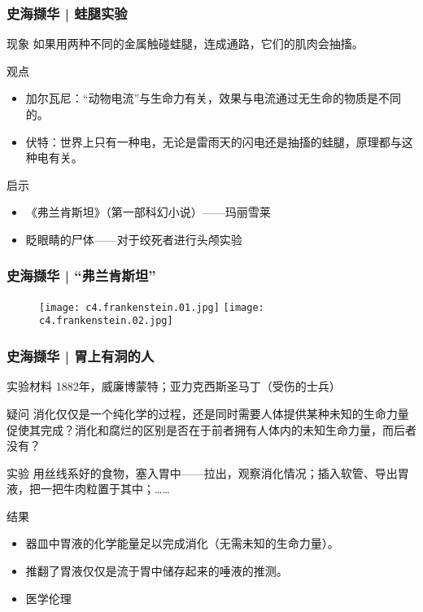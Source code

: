 \begin{frame}
  \frametitle{史海撷华 | 蛙腿实验}
  \begin{block}{现象}
    如果用两种不同的金属触碰蛙腿，连成通路，它们的肌肉会抽搐。
  \end{block}
  \pause
  \begin{block}{观点}
    \begin{itemize}
      \item 加尔瓦尼：“动物电流”与生命力有关，效果与电流通过无生命的物质是不同的。
      \item 伏特：世界上只有一种电，无论是雷雨天的闪电还是抽搐的蛙腿，原理都与这种电有关。
    \end{itemize}
  \end{block}
  \pause
  \begin{block}{启示}
    \begin{itemize}
      \item 《弗兰肯斯坦》（第一部科幻小说）——玛丽\textbullet 雪莱
      \item 眨眼睛的尸体——对于绞死者进行头颅实验
    \end{itemize}
  \end{block}
\end{frame}

\begin{frame}
  \frametitle{史海撷华 | “弗兰肯斯坦”}
  \begin{figure}
    \centering
    \texttt{[image: c4.frankenstein.01.jpg]}\quad
    \texttt{[image: c4.frankenstein.02.jpg]}
  \end{figure}
\end{frame}

\begin{frame}
  \frametitle{史海撷华 | 胃上有洞的人}
  \begin{block}{实验材料}
       1882年，威廉\textbullet 博蒙特；亚力克西斯\textbullet 圣马丁（受伤的士兵）
  \end{block}
  \vspace{-0.5em}
  \pause
  \begin{block}{疑问}
消化仅仅是一个纯化学的过程，还是同时需要人体提供某种未知的生命力量促使其完成？消化和腐烂的区别是否在于前者拥有人体内的未知生命力量，而后者没有？
  \end{block}
  \vspace{-0.5em}
  \pause
  \begin{block}{实验}
      用丝线系好的食物，塞入胃中——拉出，观察消化情况；插入软管、导出胃液，把一把牛肉粒置于其中；……
  \end{block}
  \vspace{-0.5em}
  \pause
  \begin{block}{结果}
    \begin{itemize}
      \item 器皿中胃液的化学能量足以完成消化（无需未知的生命力量）。
      \item 推翻了胃液仅仅是流于胃中储存起来的唾液的推测。
      \item 医学伦理
    \end{itemize}
  \end{block}
\end{frame}

